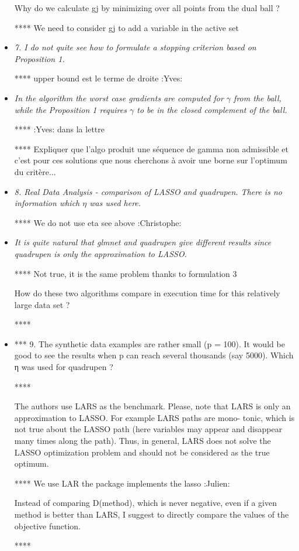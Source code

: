 \documentclass[a4paper,11pt]{texMemo}
\begin{document}
\begin{itemize}
Why do we calculate gj by minimizing over all points from the dual ball ?

**** We need to consider gj to add a variable in the active set

\item
  \emph{7. I do not quite see how to formulate a stopping criterion based on Proposition 1.}
  
**** upper bound est le terme de droite :Yves:


\item
\emph{In the algorithm the worst case gradients are computed for $\gamma$ from the ball,
while the Proposition 1 requires $\gamma$  to be in the closed
complement of the ball.
}

**** :Yves: dans la lettre

**** Expliquer que l'algo produit une séquence de gamma non admissible et c'est pour ces solutions 
que nous cherchons à avoir une borne sur l'optimum du critère...

\item 
\emph{8. Real Data Analysis - comparison of LASSO and quadrupen.
There is no information which $\eta$ was used here. }

**** We do not use eta see above :Christophe:


\item
\emph{
It is quite natural that glmnet and quadrupen give different results since quadrupen is only the
approximation to LASSO. }

**** Not true, it is the same problem thanks to formulation 3

How do these two algorithms compare in execution time for this relatively large data set ?

**** 

\item
*** 9. The synthetic data examples are rather small (p = 100).
It would be good to see the results when p can reach several thousands (say 5000).
 Which η was used for quadrupen ?

**** 

The authors use LARS as the benchmark.
 Please, note that LARS is only an approximation to LASSO.
 For example LARS paths are mono- tonic, 
which is not true about the LASSO path (here variables may appear and disappear many times along the path). 
Thus, in general, LARS does not solve the LASSO optimization problem and should not be considered as the true optimum.

**** We use LAR the package implements the lasso :Julien:


Instead of comparing D(method), which is never negative,
even if a given method is better than LARS, 
I suggest to directly compare the values of the objective function.


**** 
\end{itemize}

 

\end{document}
